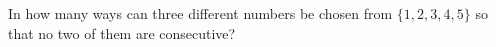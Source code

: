 In how many ways can three different numbers be chosen from $\{1,2,3,4,5\}$ so that no two of them are consecutive?
